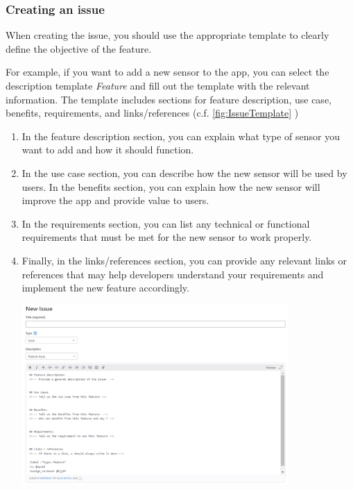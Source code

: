 \documentclass[12pt]{article}
\begin{document}
\subsubsection{Creating an issue}
When creating the issue, you should use the appropriate template to clearly define the objective of the feature. 

For example, if you want to add a new sensor to the app, you can select the description template \textit{Feature} and fill out the template with the relevant information. The template includes sections for feature description, use case, benefits, requirements, and links/references (c.f. \autoref{fig:IssueTemplate} )
 \begin{enumerate}
      \item
      In the feature description section, you can explain what type of sensor you want to add and how it should function. 
      \item
      In the use case section, you can describe how the new sensor will be used by users. In the benefits section, you can explain how the new sensor will improve the app and provide value to users. 
      \item
      In the requirements section, you can list any technical or functional requirements that must be met for the new sensor to work properly. 
      \item
      Finally, in the links/references section, you can provide any relevant links or references that may help developers understand your requirements and implement the new feature accordingly. 
      

    \includegraphics[width=0.8\textwidth]{issue.png}

    \label{fig:IssueTemplate}
  
 \end{enumerate}
\end{document}
